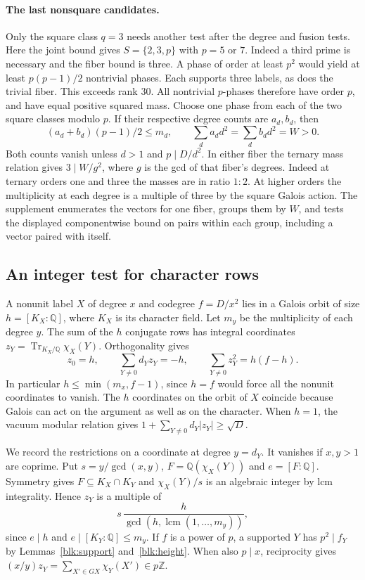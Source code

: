 \documentclass[11pt]{amsart}
\numberwithin{equation}{section}
\begin{document}
\paragraph{The last nonsquare candidates.}
Only the square class $q=3$ needs another test after the degree and fusion tests. Here the joint bound gives $S=\{2,3,p\}$ with $p=5$ or $7$. Indeed a third prime is necessary and the fiber bound is three. A phase of order at least $p^2$ would yield at least $p(p-1)/2$ nontrivial phases. Each supports three labels, as does the trivial fiber. This exceeds rank $30$. All nontrivial $p$-phases therefore have order $p$, and have equal positive squared mass. Choose one phase from each of the two square classes modulo $p$. If their respective degree counts are $a_d,b_d$, then
\[
  (a_d+b_d)(p-1)/2\le m_d,\qquad
  \sum_d a_dd^2=\sum_d b_dd^2=W>0.
\]
Both counts vanish unless $d>1$ and $p\mid D/d^2$. In either fiber the ternary mass relation gives
$3\mid W/g^2$, where $g$ is the gcd of that fiber's degrees.
Indeed at ternary orders one and three the masses are in ratio $1:2$. At higher orders the multiplicity at each degree is a multiple of three by the square Galois action. The supplement enumerates the vectors for one fiber, groups them by $W$, and tests the displayed componentwise bound on pairs within each group, including a vector paired with itself.

\subsection{An integer test for character rows}\label{sq:orbits}
A nonunit label $X$ of degree $x$ and codegree $f=D/x^2$ lies in a Galois orbit of size $h=[K_X:\mathbb Q]$, where $K_X$ is its character field. Let $m_y$ be the multiplicity of each degree $y$. The sum of the $h$ conjugate rows has integral coordinates $z_Y=\operatorname{Tr}_{K_X/\mathbb Q}\chi_X(Y)$. Orthogonality gives
\begin{equation}\label{sq:orbit}
 z_0=h,\qquad \sum_{Y\ne0}d_Y z_Y=-h,\qquad
             \sum_{Y\ne0}z_Y^2=h(f-h).
\end{equation}
In particular $h\le\min(m_x,f-1)$, since $h=f$ would force all the nonunit coordinates to vanish. The $h$ coordinates on the orbit of $X$ coincide because Galois can act on the argument as well as on the character. When $h=1$, the vacuum modular relation gives $1+\sum_{Y\ne0}d_Y|z_Y|\ge\sqrt D$.

We record the restrictions on a coordinate at degree $y=d_Y$. It vanishes if $x,y>1$ are coprime. Put $s=y/\gcd(x,y)$, $F=\mathbb Q(\chi_X(Y))$ and $e=[F:\mathbb Q]$. Symmetry gives $F\subseteq K_X\cap K_Y$ and $\chi_X(Y)/s$ is an algebraic integer by lcm integrality. Hence $z_Y$ is a multiple of
\[
 s\,\frac{h}{\gcd(h,\operatorname{lcm}(1,\ldots,m_y))},
\]
since $e\mid h$ and $e\mid [K_Y:\mathbb Q]\le m_y$. If $f$ is a power of $p$, a supported $Y$ has $p^2\mid f_Y$ by Lemmas~\ref{blk:support} and~\ref{blk:height}. When also $p\mid x$, reciprocity gives $(x/y)z_Y=\sum_{X'\in G X}\chi_Y(X')\in p\mathbb Z$.
\end{document}
